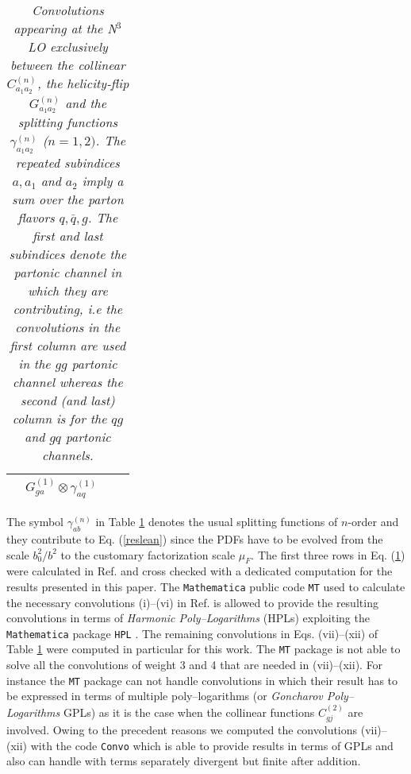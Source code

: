 \documentclass[12pt]{article}
\begin{document}
\begin{appendix}
\begin{table}
\begin{center}
\begin{tabular}{ |c|c||c|c| }
& $G^{(1)}_{ga}\otimes\gamma^{(1)}_{aq}$  \\
\hline
\end{tabular}
\caption{\label{Table:convosN3LO}
{\em Convolutions appearing at the N$^{3}$LO exclusively between the collinear $C^{(n)}_{a_{1}a_{2}}$, the helicity-flip $G^{(n)}_{a_{1}a_{2}}$ and the splitting functions $\gamma^{(n)}_{a_{1}a_{2}}$ ($n=1,2)$. The repeated subindices $a,a_{1}$ and $a_{2}$ imply a sum over the parton flavors $q,\bar{q},g$.  The first and last subindices denote the partonic channel in which they are contributing, i.e the convolutions in the first column are used in the $gg$ partonic channel whereas the second (and last) column is for the $qg$ and $gq$ partonic channels.
}}
\renewcommand{\arraystretch}{1}
\end{center}
\end{table}
The symbol $\gamma_{ab}^{(n)}$ in Table \ref{Table:convosN3LO} denotes the usual splitting functions of $n$-order and they contribute to Eq. (\ref{reslean}) since the PDFs have to be evolved from the scale $b_0^2/b^2$ to the customary factorization scale $\mu_{F}$.
The first three rows in Eq. (\ref{Table:convosN3LO}) were calculated in Ref. \cite{Hoschele:2012xc} and cross checked with a dedicated computation for the results presented in this paper. The \texttt{Mathematica} public code \texttt{MT} \cite{Hoeschele:2013gga} used to calculate the necessary convolutions (i)--(vi) in Ref. \cite{Hoschele:2012xc} is allowed to provide the resulting convolutions in terms of \textit{Harmonic Poly--Logarithms} (HPLs) \cite{Remiddi:1999ew} exploiting the \texttt{Mathematica} package \texttt{HPL} \cite{Maitre:2005uu}. 
The remaining convolutions in Eqs. (vii)--(xii) of Table \ref{Table:convosN3LO}  were computed in particular for this work. The \texttt{MT} \cite{Hoeschele:2013gga} package is not able to solve all the convolutions of weight 3 and 4 that are needed in (vii)--(xii). For instance the \texttt{MT} package can not handle convolutions in which their result has to be expressed in terms of multiple poly--logarithms (or {\em Goncharov Poly--Logarithms} GPLs) \cite{Goncharov:1998kja,Goncharov:2001iea} as it is the case when the collinear functions $C^{(2)}_{gj}$ are involved. Owing to the precedent reasons we computed the convolutions (vii)--(xii) with the code \texttt{Convo} which is able to provide results in terms of GPLs and also can handle with terms  separately divergent but finite after addition.


\end{appendix}
\end{document}
